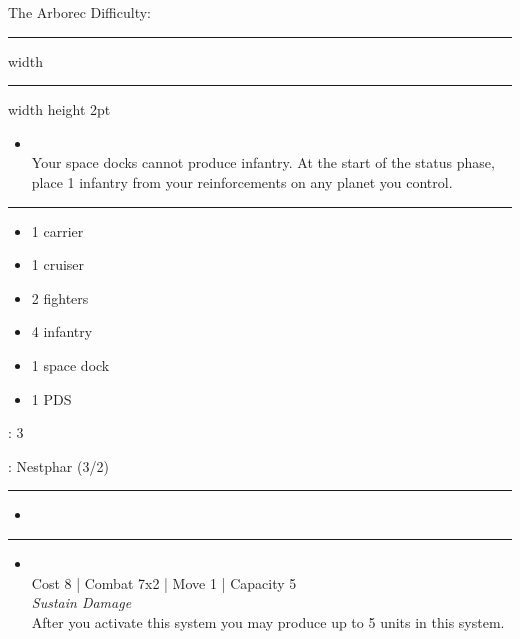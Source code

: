 \newpage
{\handel \Huge The Arborec} \hfill {\Large Difficulty: \hard} \vspace{-4pt}\\
\hrule width \hsize \kern 1mm \hrule width \hsize height 2pt


\begin{multicols}{2}


\begin{itemize}
\item {}\\
Your space docks cannot produce infantry. At the start of the status phase, place 1 infantry from your reinforcements on any planet you control.
\end{itemize}


\vspace{-10pt}\rule{\hsize}{0.4pt}\vspace{5pt}


\vspace{-5pt}
\begin{multicols}{2}
\begin{itemize}
\item 1 carrier
\item 1 cruiser
\item 2 fighters
\item 4 infantry
\item 1 space dock
\item 1 PDS
\end{itemize}
\end{multicols}

\vspace{-5pt}
: 3

\vspace{2pt}
: Nestphar (3/2)

\rule{\hsize}{0.4pt}\vspace{5pt}


\begin{itemize}
\item \magen
\end{itemize}

\vspace{-10pt}\rule{\hsize}{0.4pt}\vspace{5pt}


\begin{itemize}
\item {}\\
Cost 8 | Combat 7x2 | Move 1 | Capacity 5 \\
\emph{Sustain Damage}\\
After you activate this system you may produce up to 5 units in this system.
\end{itemize}


\end{multicols}

